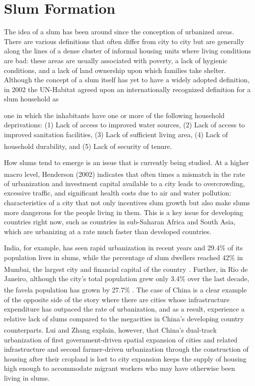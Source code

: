 
\section{Slum Formation}
The idea of a slum has been around since the conception of urbanized areas. There are various definitions that often differ from city to city but are generally along the lines of a dense cluster of informal housing units where living conditions are bad: these areas are usually associated with poverty, a lack of hygienic conditions, and a lack of land ownership upon which families take shelter. Although the concept of a slum itself has yet to have a widely adopted definition, in 2002 the UN-Habitat agreed upon an internationally recognized definition for a slum household as 
\begin{quoting}
one in which the inhabitants have one or more of the following household deprivations: (1) Lack of access to improved water sources, (2) Lack of access to improved sanitation facilities, (3) Lack of sufficient living area, (4) Lack of household durability, and (5) Lack of security of tenure\textsuperscript{\cite{UNslumdef}}.
\end{quoting}

How slums tend to emerge is an issue that is currently being studied. At a higher macro level, Henderson (2002)\textsuperscript{\cite{Henderson}} indicates that often times a mismatch in the rate of urbanization and investment capital available to a city leads to overcrowding, excessive traffic, and significant health costs due to air and water pollution: characteristics of a city that not only incentives slum growth but also make slums more dangerous for the people living in them. This is a key issue for developing countries right now, such as countries in sub-Saharan Africa and South Asia, which are urbanizing at a rate much faster than developed countries.

India, for example, has seen rapid urbanization in recent years and 29.4\% of its population lives in slums, while the percentage of slum dwellers reached 42\% in Mumbai, the largest city and financial capital of the country\textsuperscript{~\cite{MTSU}}. Further, in Rio de Janeiro, although the city's total population grew only 3.4\% over the last decade, the favela population has grown by 27.7\% \textsuperscript{\cite{LuiZhang}}. The case of China is a clear example of the opposite side of the story where there are cities whose infrastructure expenditure has outpaced the rate of urbanization, and as a result, experience a relative lack of slums compared to the megacities in China's developing country counterparts. Lui and Zhang\textsuperscript{\cite{LuiZhang}} explain, however, that China's dual-track urbanization of first government-driven spatial expansion of cities and related infrastructure and second farmer-driven urbanization through the construction of housing after their cropland is lost to city expansion keeps the supply of housing high enough to accommodate migrant workers who may have otherwise been living in slums.

